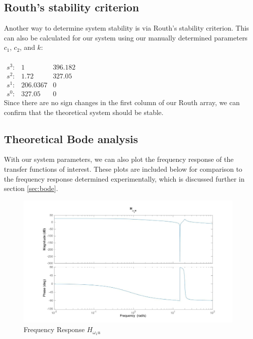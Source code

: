 \documentclass[11pt,titlepage]{article}
\begin{document}
	
	\subsection{Routh's stability criterion}
	Another way to determine system stability is via Routh's stability criterion. This can also be calculated for our system using our manually determined parameters $c_1$, $c_2$, and $k$:\\\\
	$\begin{matrix}
		s^3: & 1 & 396.182\\
		s^2: & 1.72 & 327.05\\
		s^1: & 206.0367 & 0\\
		s^0: & 327.05 & 0
	\end{matrix}$\\

	 Since there are no sign changes in the first column of our Routh array, we can confirm that the theoretical system should be stable.

	\subsection{Theoretical Bode analysis}
	With our system parameters, we can also plot the frequency response of the transfer functions of interest. These plots are included below for comparison to the frequency response determined experimentally, which is discussed further in section \ref{sec:bode}. 
	
	\begin{figure}[H]
            \centering
            \includegraphics[trim={6cm 0 1cm 1cm},clip,origin=c,scale=0.26]{w1_bode}
            \caption{Frequency Response $H_{\omega_{1}u}$}
            \label{fig:disc_sys}
       \end{figure}
       
\end{document}
